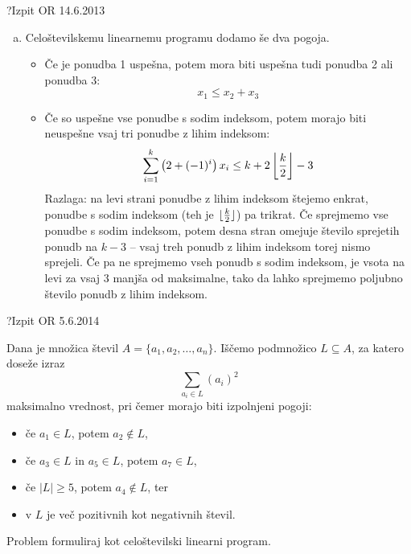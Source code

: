\begin{naloga}{?}{Izpit OR 14.6.2013}
\begin{odgovor}
\begin{enumerate}[(a)]
\item Celoštevilskemu linearnemu programu dodamo še dva pogoja.
    \begin{itemize}
    \item Če je ponudba 1 uspešna,
    potem mora biti uspešna tudi ponudba 2 ali ponudba 3:
    $$
    x_1 \le x_2 + x_3
    $$
    \item Če so uspešne vse ponudbe s sodim indeksom,
    potem morajo biti ne\-uspeš\-ne vsaj tri ponudbe z lihim indeksom:
    $$
    \sum_{i=1}^{k} \left(2 + (-1)^i\right) x_{i}
    \le k + 2 \left\lfloor {k \over 2} \right\rfloor - 3
    $$
    Razlaga: na levi strani ponudbe z lihim indeksom štejemo enkrat,
    ponudbe s sodim indeksom
    (teh je $\lfloor {k \over 2} \rfloor$)
    pa trikrat.
    Če sprejmemo vse ponudbe s sodim indeksom,
    potem desna stran omejuje število sprejetih ponudb na $k - 3$
    -- vsaj treh ponudb z lihim indeksom torej nismo sprejeli.
    Če pa ne sprejmemo vseh ponudb s sodim indeksom,
    je vsota na levi za vsaj $3$ manjša od maksimalne,
    tako da lahko sprejmemo poljubno število ponudb z lihim indeksom.
    \end{itemize}
\end{enumerate}
\end{odgovor}
\end{naloga}


\begin{naloga}{?}{Izpit OR 5.6.2014}
\begin{vprasanje}[vsotakvadratov]
Dana je množica števil $A = \{a_1, a_2, \dots, a_n\}$.
Iščemo podmnožico $L \subseteq A$,
za katero doseže izraz
$$
\sum_{a_i \in L} (a_i)^2
$$
maksimalno vrednost,
pri čemer morajo biti izpolnjeni pogoji:
\begin{itemize}
\item če $a_1 \in L$, potem $a_2 \not\in L$,
\item če $a_3 \in L$ in $a_5 \in L$, potem $a_7 \in L$,
\item če $|L| \ge 5$, potem $a_4 \not\in L$, ter
\item v $L$ je več pozitivnih kot negativnih števil.
\end{itemize}
Problem formuliraj kot celoštevilski linearni program.
\end{vprasanje}
\begin{odgovor}
\end{odgovor}
\end{naloga}


